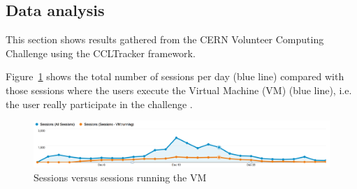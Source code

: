 \documentclass{article}
\begin{document}






\subsection{Data analysis}

This section shows results gathered from the CERN Volunteer Computing Challenge using the CCLTracker framework. 

Figure~\ref{img:Sessions versus sessions running the VM} shows the total number of sessions per day (blue line) compared with those sessions where the users execute the Virtual Machine (VM) (blue line), i.e. the user really participate in the challenge . 






\begin{figure}[t]
  \begin{center}
		\includegraphics[width=15cm]{imgs/sessionVSsessionVMRunning.png}
  \end{center}
\caption{Sessions versus sessions running the VM}
\label{img:Sessions versus sessions running the VM}
\end{figure}

      
    
    
    
      
      
\end{document}
